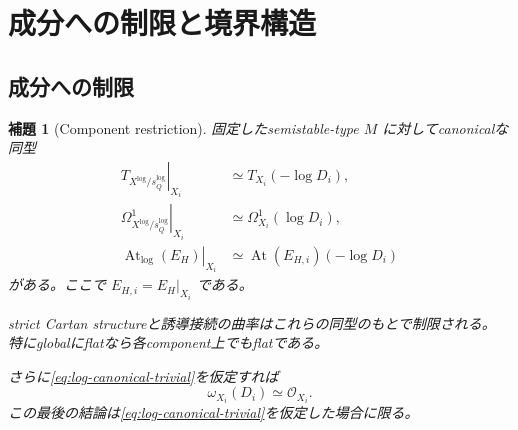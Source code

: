 \documentclass[uplatex,dvipdfmx,11pt]{jsarticle}
\numberwithin{equation}{section}
\theoremstyle{plain}
\newtheorem{lemma}[theorem]{補題}
\theoremstyle{definition}
\theoremstyle{remark}
\DeclareMathOperator{\At}{At}
\newcommand{\OO}{\mathcal O}
\newcommand{\Tlog}{T_{X^{\log}/s_Q^{\log}}}
\newcommand{\Omlog}{\Omega^1_{X^{\log}/s_Q^{\log}}}
\newcommand{\Atlog}{\At_{\log}}
\newcommand{\restr}[2]{\left.#1\right|_{#2}}
\begin{document}
\section{成分への制限と境界構造}
\label{sec:boundary}

\subsection{成分への制限}

\begin{lemma}[Component restriction]
\label{lem:restriction}
固定したsemistable-type \(M\) に対してcanonicalな同型
\begin{align}
\restr{\Tlog}{X_i}
&\simeq T_{X_i}(-\log D_i), \label{eq:tangent-restriction}\\
\restr{\Omlog}{X_i}
&\simeq\Omega^1_{X_i}(\log D_i), \label{eq:forms-restriction}\\
\restr{\Atlog(E_H)}{X_i}
&\simeq\At(E_{H,i})(-\log D_i) \label{eq:atiyah-restriction}
\end{align}
がある。ここで \(E_{H,i}=E_H|_{X_i}\) である。

strict Cartan structureと誘導接続の曲率はこれらの同型のもとで制限される。
特にglobalにflatなら各component上でもflatである。

さらに\eqref{eq:log-canonical-trivial}を仮定すれば
\[
\omega_{X_i}(D_i)\simeq\OO_{X_i}.
\]
この最後の結論は\eqref{eq:log-canonical-trivial}を仮定した場合に限る。
\end{lemma}
\end{document}
